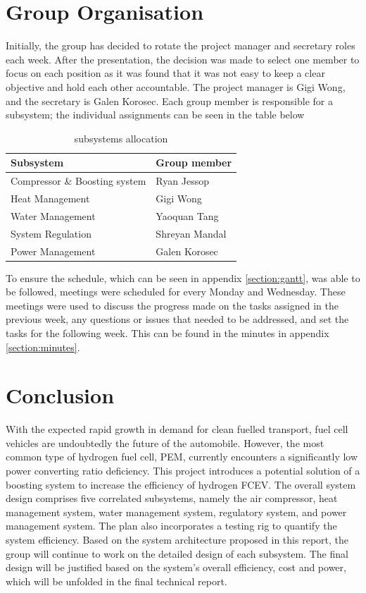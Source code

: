\documentclass[a4paper,11pt]{article}
\begin{document}
\section{Group Organisation}
Initially, the group has decided to rotate the project manager and secretary roles each week. After the presentation, the decision was made to select one member to focus on each position as it was found that it was not easy to keep a clear objective and hold each other accountable. The project manager is Gigi Wong, and the secretary is Galen Korosec. Each group member is responsible for a subsystem; the individual assignments can be seen in the table below

\begin{table}[h!]
    \centering
    \begin{tabular}{|l|l|}%
    \hline
    \textbf{Subsystem} & \textbf{Group member} \\ [0.5ex] 
    \hline
    Compressor \& Boosting system & Ryan Jessop \\
    Heat Management & Gigi Wong \\
    Water Management & Yaoquan Tang \\
    System Regulation & Shreyan Mandal \\
    Power Management & Galen Korosec \\
    \hline
    \end{tabular}
    \caption{subsystems allocation}
    \label{tab:groupworkassignments}
\end{table}

To ensure the schedule, which can be seen in appendix \ref{section:gantt}, was able to be followed, meetings were scheduled for every Monday and Wednesday. These meetings were used to discuss the progress made on the tasks assigned in the previous week, any questions or issues that needed to be addressed, and set the tasks for the following week. This can be found in the minutes in appendix \ref{section:minutes}.

\section{Conclusion}
With the expected rapid growth in demand for clean fuelled transport, fuel cell vehicles are undoubtedly the future of the automobile. However, the most common type of hydrogen fuel cell, PEM, currently encounters a significantly low power converting ratio deficiency. This project introduces a potential solution of a boosting system to increase the efficiency of hydrogen FCEV. The overall system design comprises five correlated subsystems, namely the air compressor, heat management system, water management system, regulatory system, and power management system. The plan also incorporates a testing rig to quantify the system efficiency.
Based on the system architecture proposed in this report, the group will continue to work on the detailed design of each subsystem. The final design will be justified based on the system's overall efficiency, cost and power, which will be unfolded in the final technical report.\newline
\end{document}
